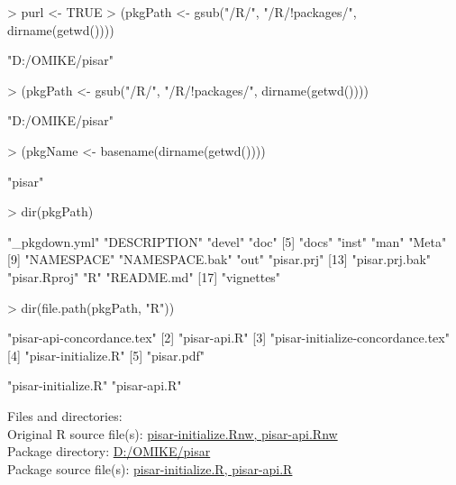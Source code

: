 \documentclass[a4paper,12pt]{article}\usepackage[]{graphicx}\usepackage[]{color}
\begin{document}
\begin{Schunk}
\begin{Sinput}
> purl <- TRUE
> (pkgPath <- gsub("/R/", "/R/!packages/", dirname(getwd())))
\end{Sinput}
\begin{Soutput}
[1] "D:/OMIKE/pisar"
\end{Soutput}
\begin{Sinput}
> (pkgPath <- gsub("/R/", "/R/!packages/", dirname(getwd())))
\end{Sinput}
\begin{Soutput}
[1] "D:/OMIKE/pisar"
\end{Soutput}
\begin{Sinput}
> (pkgName <- basename(dirname(getwd())))
\end{Sinput}
\begin{Soutput}
[1] "pisar"
\end{Soutput}
\begin{Sinput}
> dir(pkgPath)
\end{Sinput}
\begin{Soutput}
 [1] "_pkgdown.yml"  "DESCRIPTION"   "devel"         "doc"          
 [5] "docs"          "inst"          "man"           "Meta"         
 [9] "NAMESPACE"     "NAMESPACE.bak" "out"           "pisar.prj"    
[13] "pisar.prj.bak" "pisar.Rproj"   "R"             "README.md"    
[17] "vignettes"    
\end{Soutput}
\begin{Sinput}
> dir(file.path(pkgPath, "R"))
\end{Sinput}
\begin{Soutput}
[1] "pisar-api-concordance.tex"       
[2] "pisar-api.R"                     
[3] "pisar-initialize-concordance.tex"
[4] "pisar-initialize.R"              
[5] "pisar.pdf"                       
\end{Soutput}
\begin{Soutput}
[1] "pisar-initialize.R" "pisar-api.R"       
\end{Soutput}
\end{Schunk}

Files and directories:\\[12pt]
Original R source file(s): \url{pisar-initialize.Rnw, pisar-api.Rnw}\\
Package directory: \url{D:/OMIKE/pisar}\\
Package source file(s): \url{pisar-initialize.R, pisar-api.R}
\end{document}
